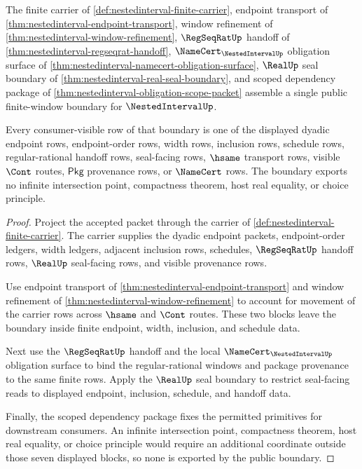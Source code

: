 \begin{theorem}
\label{thm:nestedinterval-public-window-boundary}
The finite carrier of \autoref{def:nestedinterval-finite-carrier}, endpoint transport of \autoref{thm:nestedinterval-endpoint-transport}, window refinement of \autoref{thm:nestedinterval-window-refinement}, $\RegSeqRatUp$ handoff of \autoref{thm:nestedinterval-regseqrat-handoff}, $\NameCert_{\NestedIntervalUp}$ obligation surface of \autoref{thm:nestedinterval-namecert-obligation-surface}, $\RealUp$ seal boundary of \autoref{thm:nestedinterval-real-seal-boundary}, and scoped dependency package of \autoref{thm:nestedinterval-obligation-scope-packet} assemble a single public finite-window boundary for $\NestedIntervalUp$.

Every consumer-visible row of that boundary is one of the displayed dyadic endpoint rows, endpoint-order rows, width rows, inclusion rows, schedule rows, regular-rational handoff rows, seal-facing rows, $\hsame$ transport rows, visible $\Cont$ routes, $\mathsf{Pkg}$ provenance rows, or $\NameCert$ rows. The boundary exports no infinite intersection point, compactness theorem, host real equality, or choice principle.
\end{theorem}
\begin{proof}
Project the accepted packet through the carrier of \autoref{def:nestedinterval-finite-carrier}. The carrier supplies the dyadic endpoint packets, endpoint-order ledgers, width ledgers, adjacent inclusion rows, schedules, $\RegSeqRatUp$ handoff rows, $\RealUp$ seal-facing rows, and visible provenance rows.

Use endpoint transport of \autoref{thm:nestedinterval-endpoint-transport} and window refinement of \autoref{thm:nestedinterval-window-refinement} to account for movement of the carrier rows across $\hsame$ and $\Cont$ routes. These two blocks leave the boundary inside finite endpoint, width, inclusion, and schedule data.

Next use the $\RegSeqRatUp$ handoff and the local $\NameCert_{\NestedIntervalUp}$ obligation surface to bind the regular-rational windows and package provenance to the same finite rows. Apply the $\RealUp$ seal boundary to restrict seal-facing reads to displayed endpoint, inclusion, schedule, and handoff data.

Finally, the scoped dependency package fixes the permitted primitives for downstream consumers. An infinite intersection point, compactness theorem, host real equality, or choice principle would require an additional coordinate outside those seven displayed blocks, so none is exported by the public boundary.
\end{proof}

